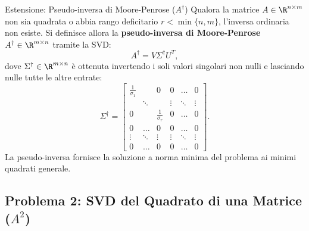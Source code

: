 \begin{noteblock}{Estensione: Pseudo-inversa di Moore-Penrose ($A^\dagger$)}
Qualora la matrice $A \in \R^{n \times m}$ non sia quadrata o abbia rango deficitario $r < \min\{n, m\}$, l'inversa ordinaria non esiste. Si definisce allora la \textbf{pseudo-inversa di Moore-Penrose} $A^\dagger \in \R^{m \times n}$ tramite la SVD:
\begin{equation}
    A^\dagger = V \Sigma^\dagger U^T,
\end{equation}
dove $\Sigma^\dagger \in \R^{m \times n}$ \`e ottenuta invertendo i soli valori singolari non nulli e lasciando nulle tutte le altre entrate:
\begin{equation}
    \Sigma^\dagger = \begin{bmatrix}
        \frac{1}{\sigma_1} & & 0 & 0 & \dots & 0 \\
        & \ddots & & \vdots & \ddots & \vdots \\
        0 & & \frac{1}{\sigma_r} & 0 & \dots & 0 \\
        0 & \dots & 0 & 0 & \dots & 0 \\
        \vdots & \ddots & \vdots & \vdots & \ddots & \vdots \\
        0 & \dots & 0 & 0 & \dots & 0
    \end{bmatrix}.
\end{equation}
La pseudo-inversa fornisce la soluzione a norma minima del problema ai minimi quadrati generale.
\end{noteblock}

\subsection{Problema 2: SVD del Quadrato di una Matrice (\texorpdfstring{$A^2$}{A\textasciicircum 2})}

